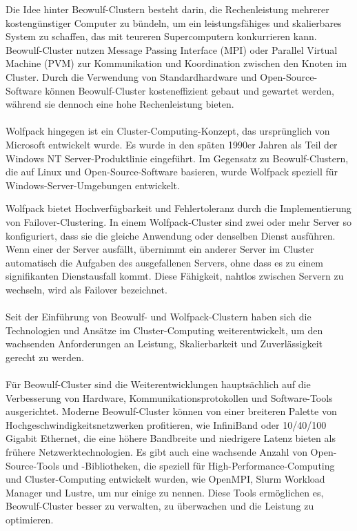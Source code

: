 \documentclass[../vs-script-first-v01.tex]{subfiles}
\begin{document}
Die Idee hinter Beowulf-Clustern besteht darin, die Rechenleistung mehrerer kostengünstiger Computer zu bündeln, um ein leistungsfähiges und skalierbares System zu schaffen, das mit teureren Supercomputern konkurrieren kann. Beowulf-Cluster nutzen Message Passing Interface (MPI) oder Parallel Virtual Machine (PVM) zur Kommunikation und Koordination zwischen den Knoten im Cluster. Durch die Verwendung von Standardhardware und Open-Source-Software können Beowulf-Cluster kosteneffizient gebaut und gewartet werden, während sie dennoch eine hohe Rechenleistung bieten.
\\\\
Wolfpack hingegen ist ein Cluster-Computing-Konzept, das ursprünglich von Microsoft entwickelt wurde. Es wurde in den späten 1990er Jahren als Teil der Windows NT Server-Produktlinie eingeführt. Im Gegensatz zu Beowulf-Clustern, die auf Linux und Open-Source-Software basieren, wurde Wolfpack speziell für Windows-Server-Umgebungen entwickelt.

Wolfpack bietet Hochverfügbarkeit und Fehlertoleranz durch die Implementierung von Failover-Clustering. In einem Wolfpack-Cluster sind zwei oder mehr Server so konfiguriert, dass sie die gleiche Anwendung oder denselben Dienst ausführen. Wenn einer der Server ausfällt, übernimmt ein anderer Server im Cluster automatisch die Aufgaben des ausgefallenen Servers, ohne dass es zu einem signifikanten Dienstausfall kommt. Diese Fähigkeit, nahtlos zwischen Servern zu wechseln, wird als Failover bezeichnet.
\\\\
Seit der Einführung von Beowulf- und Wolfpack-Clustern haben sich die Technologien und Ansätze im Cluster-Computing weiterentwickelt, um den wachsenden Anforderungen an Leistung, Skalierbarkeit und Zuverlässigkeit gerecht zu werden.
\\\\
Für Beowulf-Cluster sind die Weiterentwicklungen hauptsächlich auf die Verbesserung von Hardware, Kommunikationsprotokollen und Software-Tools ausgerichtet. Moderne Beowulf-Cluster können von einer breiteren Palette von Hochgeschwindigkeitsnetzwerken profitieren, wie InfiniBand oder 10/40/100 Gigabit Ethernet, die eine höhere Bandbreite und niedrigere Latenz bieten als frühere Netzwerktechnologien. Es gibt auch eine wachsende Anzahl von Open-Source-Tools und -Bibliotheken, die speziell für High-Performance-Computing und Cluster-Computing entwickelt wurden, wie OpenMPI, Slurm Workload Manager und Lustre, um nur einige zu nennen. Diese Tools ermöglichen es, Beowulf-Cluster besser zu verwalten, zu überwachen und die Leistung zu optimieren.
\end{document}
